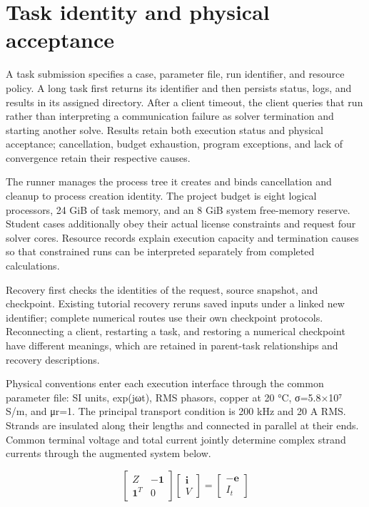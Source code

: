 \section{Task identity and physical acceptance}
\label{chapter:03}

\hypertarget{auto.03.p1}{}
A task submission specifies a case, parameter file, run identifier, and resource policy. A long task first returns its identifier and then persists status, logs, and results in its assigned directory. After a client timeout, the client queries that run rather than interpreting a communication failure as solver termination and starting another solve. Results retain both execution status and physical acceptance; cancellation, budget exhaustion, program exceptions, and lack of convergence retain their respective causes.

\hypertarget{auto.03.p2}{}
The runner manages the process tree it creates and binds cancellation and cleanup to process creation identity. The project budget is eight logical processors, 24 GiB of task memory, and an 8 GiB system free-memory reserve. Student cases additionally obey their actual license constraints and request four solver cores. Resource records explain execution capacity and termination causes so that constrained runs can be interpreted separately from completed calculations. \cite{PSUTIL,PYTHON}

\hypertarget{auto.03.p3}{}
Recovery first checks the identities of the request, source snapshot, and checkpoint. Existing tutorial recovery reruns saved inputs under a linked new identifier; complete numerical routes use their own checkpoint protocols. Reconnecting a client, restarting a task, and restoring a numerical checkpoint have different meanings, which are retained in parent-task relationships and recovery descriptions.

\hypertarget{auto.03.p4}{}
Physical conventions enter each execution interface through the common parameter file: SI units, exp(jωt), RMS phasors, copper at 20 °C, σ=5.8×10⁷ S/m, and μr=1. The principal transport condition is 200 kHz and 20 A RMS. Strands are insulated along their lengths and connected in parallel at their ends. Common terminal voltage and total current jointly determine complex strand currents through the augmented system below.

\hypertarget{auto.03.equation}{}
\hypertarget{E04}{}\begin{equation}\begin{bmatrix} Z&-\mathbf1\\ \mathbf1^T&0\end{bmatrix}\begin{bmatrix}\mathbf i\\V\end{bmatrix}=\begin{bmatrix}-\mathbf e\\I_t\end{bmatrix}\tag{1}\label{eq:E04}\end{equation}

